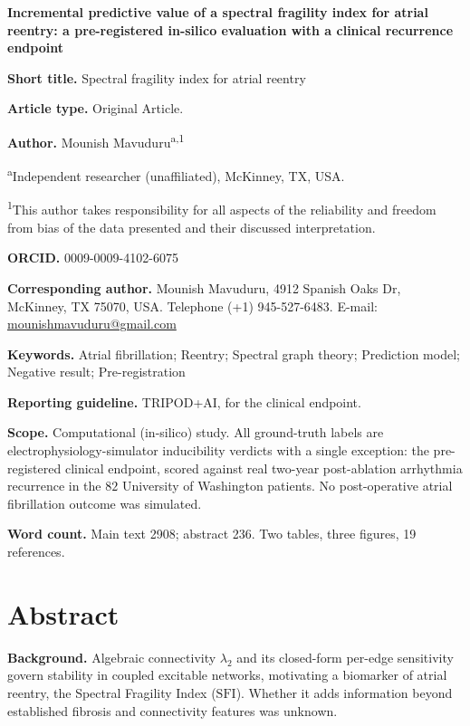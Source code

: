 \documentclass[11pt]{article}
\newcommand{\lam}{\lambda}
\newcommand{\SFI}{\ensuremath{\mathrm{SFI}}}
\begin{document}
\thispagestyle{empty}

\begin{center}
{\Large\bfseries Incremental predictive value of a spectral fragility index for
atrial reentry: a pre-registered in-silico evaluation with a clinical
recurrence endpoint\par}
\end{center}

\vspace{0.7em}
\noindent\textbf{Short title.} Spectral fragility index for atrial reentry

\smallskip
\noindent\textbf{Article type.} Original Article.

\smallskip
\noindent\textbf{Author.} Mounish Mavuduru\textsuperscript{a,1}

\smallskip
\noindent\textsuperscript{a}Independent researcher (unaffiliated), McKinney, TX,
USA.

\smallskip
\noindent\textsuperscript{1}This author takes responsibility for all aspects of
the reliability and freedom from bias of the data presented and their discussed
interpretation.

\smallskip
\noindent\textbf{ORCID.} 0009-0009-4102-6075

\smallskip
\noindent\textbf{Corresponding author.} Mounish Mavuduru, 4912 Spanish Oaks Dr,
McKinney, TX 75070, USA. Telephone (+1) 945-527-6483. E-mail:
\href{mailto:mounishmavuduru@gmail.com}{mounishmavuduru@gmail.com}

\vspace{0.7em}
\noindent\textbf{Keywords.} Atrial fibrillation; Reentry; Spectral graph theory;
Prediction model; Negative result; Pre-registration

\smallskip
\noindent\textbf{Reporting guideline.} TRIPOD+AI, for the clinical endpoint.

\smallskip
\noindent\textbf{Scope.} Computational (in-silico) study. All ground-truth labels
are electrophysiology-simulator inducibility verdicts with a single exception:
the pre-registered clinical endpoint, scored against real two-year
post-ablation arrhythmia recurrence in the $82$ University of Washington
patients. No post-operative atrial fibrillation outcome was simulated.

\smallskip
\noindent\textbf{Word count.} Main text 2908; abstract 236. Two tables,
three figures, 19 references.

\newpage

\section*{Abstract}
\noindent\textbf{Background.} Algebraic connectivity $\lam_2$ and its closed-form
per-edge sensitivity govern stability in coupled excitable networks, motivating
a biomarker of atrial reentry, the Spectral Fragility Index (\SFI). Whether it
adds information beyond established fibrosis and connectivity features was
unknown.
\end{document}
